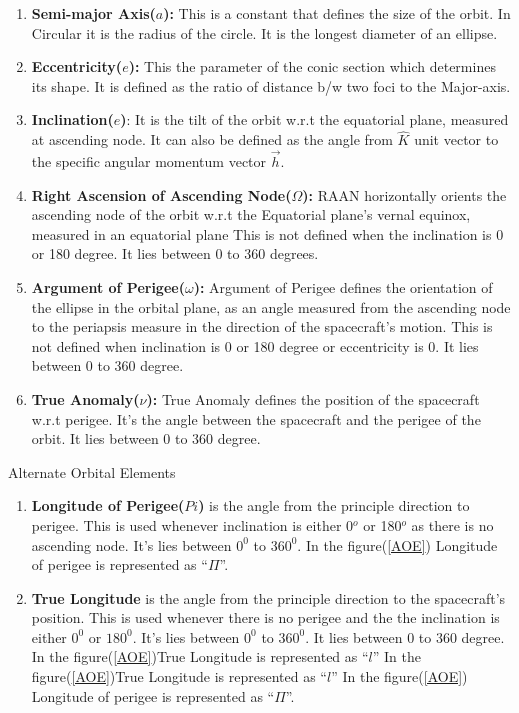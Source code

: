 \documentclass[12pt]{article}
\begin{document}
\begin{enumerate}
\item \textbf{Semi-major Axis($a$):} This is a constant that defines the size of the orbit. In Circular it is the radius of the circle. It is the longest diameter of an ellipse.
\item \textbf{Eccentricity($e$):} This the parameter of the conic section which determines its shape. It is defined as the ratio of distance b/w two foci to the Major-axis.
\item \textbf{Inclination($e$)}: It is the tilt of the orbit w.r.t the equatorial plane, measured at ascending node. It can also be defined as the angle from $\hat{K}$ unit vector to the specific angular momentum vector $\vec{h}$.
\item \textbf{Right Ascension of Ascending Node($\Omega$):} RAAN horizontally orients the ascending node of the orbit w.r.t the Equatorial plane’s vernal equinox, measured in an equatorial plane This is not defined when the inclination is 0 or 180 degree. It lies between 0 to 360 degrees.
\item \textbf{Argument of Perigee($\omega$):} Argument of Perigee defines the orientation of the ellipse in the orbital plane, as an angle measured from the ascending node to the periapsis measure in the direction of the spacecraft’s motion. This is not defined when inclination is 0 or 180 degree or eccentricity is 0. It lies between 0 to 360 degree.
\item \textbf{True Anomaly($\nu$):} True Anomaly defines the position of the spacecraft w.r.t perigee. It’s the angle between the spacecraft and the perigee of the orbit. It lies between 0 to 360 degree. 
\end{enumerate}
\large Alternate Orbital Elements
\normalsize
\begin{enumerate}
\item \textbf{Longitude of Perigee($Pi$)} is the angle from the principle direction to perigee. This is used whenever inclination is either 0$^o$ or 180$^o$ as there is no ascending node. It's lies between $0^0$ to $360^0$. In the figure(\ref{AOE}) Longitude of perigee is represented as \enquote{$\Pi$}.
\item \textbf{True Longitude} is the angle from the principle direction to the spacecraft's position. This is used whenever there is no perigee and the the inclination is either $0^0$ or $180^0$. It's lies between $0^0$ to $360^0$. It lies between 0 to 360 degree. In the figure(\ref{AOE})True Longitude is represented as \enquote{$l$}
In the figure(\ref{AOE})True Longitude is represented as \enquote{$l$}
In the figure(\ref{AOE}) Longitude of perigee is represented as \enquote{$\Pi$}.
\end{enumerate}
\end{document}
